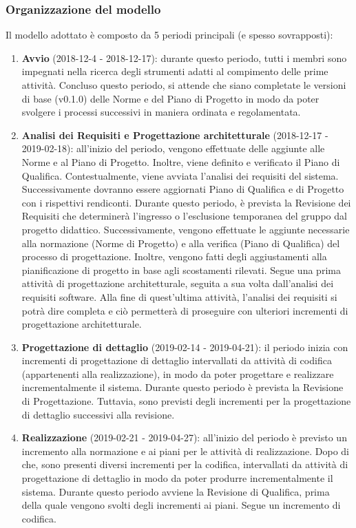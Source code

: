 \subsubsection{Organizzazione del modello}
Il modello adottato è composto da 5 periodi principali (e spesso sovrapposti):
\begin{enumerate}
	\item \textbf{Avvio} (2018-12-4 - 2018-12-17): durante questo periodo, tutti i membri sono impegnati nella ricerca degli strumenti adatti al compimento delle prime attività. Concluso questo periodo, si attende che siano completate le versioni di base (v0.1.0) delle Norme e del Piano di Progetto in modo da poter svolgere i processi successivi in maniera ordinata e regolamentata.
	\item \textbf{Analisi dei Requisiti e Progettazione architetturale} (2018-12-17 - 2019-02-18): all'inizio del periodo, vengono effettuate delle aggiunte alle Norme e al Piano di Progetto. Inoltre, viene definito e verificato il Piano di Qualifica. Contestualmente, viene avviata l'analisi dei requisiti del sistema. Successivamente dovranno essere aggiornati Piano di Qualifica e di Progetto con i rispettivi rendiconti. Durante questo periodo, è prevista la Revisione dei Requisiti che determinerà l'ingresso o l'esclusione temporanea del gruppo dal progetto didattico. Successivamente, vengono effettuate le aggiunte necessarie alla normazione (Norme di Progetto) e alla verifica (Piano di Qualifica) del processo di progettazione. Inoltre, vengono fatti degli aggiustamenti alla pianificazione di progetto in base agli scostamenti rilevati. Segue una prima attività di progettazione architetturale, seguita a sua volta dall'analisi dei requisiti software. Alla fine di quest'ultima attività, l'analisi dei requisiti si potrà dire completa e ciò permetterà di proseguire con ulteriori incrementi di progettazione architetturale. 
\item \textbf{Progettazione di dettaglio} (2019-02-14 - 2019-04-21): il periodo inizia con incrementi di progettazione di dettaglio intervallati da attività di codifica (appartenenti alla realizzazione), in modo da poter progettare e realizzare incrementalmente il sistema. Durante questo periodo è prevista la Revisione di Progettazione. Tuttavia, sono previsti degli incrementi per la progettazione di dettaglio successivi alla revisione.
	\item \textbf{Realizzazione} (2019-02-21 - 2019-04-27): all'inizio del periodo è previsto un incremento alla normazione e ai piani per le attività di realizzazione. Dopo di che, sono presenti diversi incrementi per la codifica, intervallati da attività di progettazione di dettaglio in modo da poter produrre incrementalmente il sistema. Durante questo periodo avviene la Revisione di Qualifica, prima della quale vengono svolti degli incrementi ai piani. Segue un incremento di codifica.

\end{enumerate}

